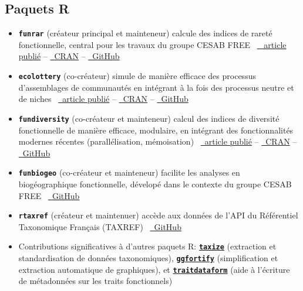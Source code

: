 \documentclass[10pt,a4paper,]{article}
\begin{document}
\subsection{Paquets R}\label{paquets-r}

\begin{itemize}
\item
  \textbf{\texttt{funrar}} (créateur principal et mainteneur)
  \hfill\break calcule des indices de rareté fonctionnelle, central pour
  les travaux du groupe CESAB FREE
  \hfill\break ~\href{https://doi.org/10.1111/ddi.12629}{\faFile*~
  article publié} --
  \href{https://cran.r-project.org/package=funrar}{\faRProject~CRAN} --
  \href{https://github.com/Rekyt/funrar}{\faGithub~GitHub}
\item
  \textbf{\texttt{ecolottery}} (co-créateur) \hfill\break simule de
  manière efficace des processus d'assemblages de communautés en
  intégrant à la fois des processus neutre et de niches
  \hfill\break ~\href{https://doi.org/10.1111/2041-210X.12918}{\faFile*~article
  publié} --
  \href{https://cran.r-project.org/package=ecolottery}{\faRProject~CRAN}
  -- \href{https://github.com/frmunoz/ecolottery}{\faGithub~GitHub}
\item
  \textbf{\texttt{fundiversity}} (co-créateur et mainteneur)
  \hfill\break calcul des indices de diversité fonctionnelle de manière
  efficace, modulaire, en intégrant des fonctionnalités modernes
  récentes (parallélisation, mémoisation)
  \hfill\break ~\href{https://doi.org/10.1111/ecog.06585}{\faFile*~article
  publié} --
  \href{https://cran.r-project.org/package=fundiversity}{\faRProject~CRAN}
  -- \href{https://github.com/bisaloo/fundiversity}{\faGithub~GitHub}
\item
  \textbf{\texttt{funbiogeo}} (co-créateur et mainteneur)
  \hfill\break facilite les analyses en biogéographique fonctionnelle,
  dévelopé dans le contexte du groupe CESAB FREE
  \hfill\break ~\href{https://github.com/FRBCesab/funbiogeo}{\faGithub~GitHub}
\item
  \textbf{\texttt{rtaxref}} (créateur et maintenuer) \hfill\break accède
  aux données de l'API du Référentiel Taxonomique Français (TAXREF)
  \hfill\break ~\href{https://github.com/Rekyt/rtaxref}{\faGithub~GitHub}
\item
  Contributions significatives à d'autres paquets R:
  \href{https://cran.r-project.org/package=taxize}{\textbf{\texttt{taxize}}}
  (extraction et standardisation de données taxonomiques),
  \href{https://cran.r-project.org/package=ggfortify}{\textbf{\texttt{ggfortify}}}
  (simplification et extraction automatique de graphiques), et
  \href{https://cran.r-project.org/package=traitdataform}{\textbf{\texttt{traitdataform}}}
  (aide à l'écriture de métadonnées sur les traits fonctionnels)
\end{itemize}
\end{document}
